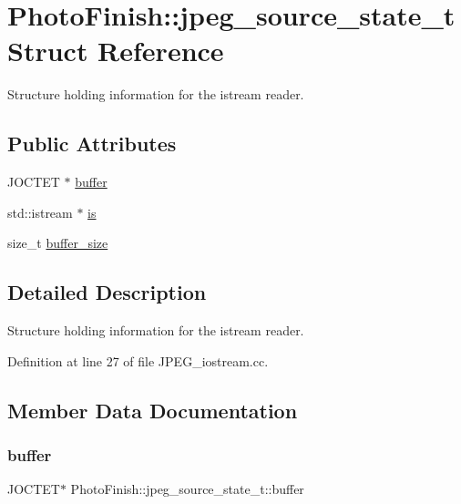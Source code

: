 \hypertarget{struct_photo_finish_1_1jpeg__source__state__t}{}\section{Photo\+Finish\+:\+:jpeg\+\_\+source\+\_\+state\+\_\+t Struct Reference}
\label{struct_photo_finish_1_1jpeg__source__state__t}


Structure holding information for the istream reader.  


\subsection*{Public Attributes}
\begin{DoxyCompactItemize}
\item 
J\+O\+C\+T\+ET $\ast$ \hyperlink{struct_photo_finish_1_1jpeg__source__state__t_a6a27d15ee5c9ebc1c9ce7ea9cc05a5e0}{buffer}
\item 
std\+::istream $\ast$ \hyperlink{struct_photo_finish_1_1jpeg__source__state__t_a017011fb487e1fd6bbc29b8bda5ab228}{is}
\item 
size\+\_\+t \hyperlink{struct_photo_finish_1_1jpeg__source__state__t_a48aee6f1aad350bcb633ae4b39ae6db4}{buffer\+\_\+size}
\end{DoxyCompactItemize}


\subsection{Detailed Description}
Structure holding information for the istream reader. 

Definition at line 27 of file J\+P\+E\+G\+\_\+iostream.\+cc.



\subsection{Member Data Documentation}
\mbox{\label{struct_photo_finish_1_1jpeg__source__state__t_a6a27d15ee5c9ebc1c9ce7ea9cc05a5e0}} 
\subsubsection{\texorpdfstring{buffer}{buffer}}
{\footnotesize\ttfamily J\+O\+C\+T\+ET$\ast$ Photo\+Finish\+::jpeg\+\_\+source\+\_\+state\+\_\+t\+::buffer}



